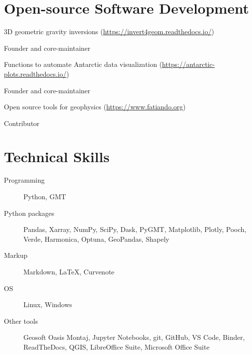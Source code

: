 \documentclass{ExpressiveResume}
\begin{document}
\begin{cventries}


\end{cventries}


\vspace{-3em}
\section{Open-source Software Development}
\begin{description}
    \item[Invert4Geom:] 3D geometric gravity inversions (\url{https://invert4geom.readthedocs.io/})
        \item Founder and core-maintainer
    \item[Antarctic-Plots:] Functions to automate Antarctic data visualization (\url{https://antarctic-plots.readthedocs.io/})
        \item Founder and core-maintainer
    \item[Fatiando a Terra:] Open source tools for geophysics (\url{https://www.fatiando.org})
        \item Contributor
\end{description}

\vspace{1em}
\section{Technical Skills}
\begin{description}
    \item[Programming] Python, GMT
    \item[Python packages] Pandas, Xarray, NumPy, SciPy, Dask, PyGMT,
        Matplotlib, Plotly, Pooch, Verde, Harmonica, Optuna, GeoPandas, Shapely
    \item[Markup] Markdown, \LaTeX, Curvenote
    \item[OS] Linux, Windows
    \item[Other tools] Geosoft Oasis Montaj, Jupyter Notebooks, git,
        GitHub, VS Code, Binder,
        ReadTheDocs, QGIS, LibreOffice Suite, Microsoft Office Suite
\end{description}
\vspace{3em}
\end{document}

